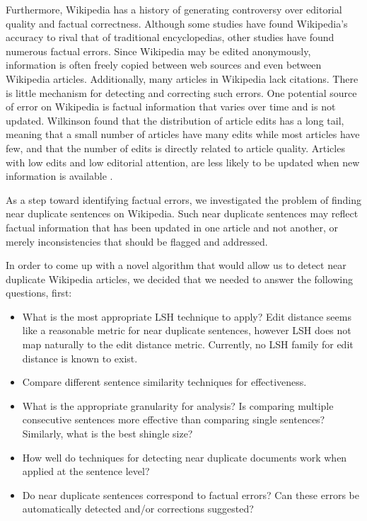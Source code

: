 \documentclass{acm_proc_article-sp}
\begin{document}
Furthermore, Wikipedia has a history of generating controversy over editorial quality and factual correctness. Although some studies have found Wikipedia’s accuracy to rival that of traditional encyclopedias, other studies have found numerous factual errors. Since Wikipedia may be edited anonymously, information is often freely copied between web sources and even between Wikipedia articles. Additionally, many articles in Wikipedia lack citations. There is little mechanism for detecting and correcting such errors. One potential source of error on Wikipedia is factual information that varies over time and is not updated. Wilkinson found that the distribution of article edits has a long tail, meaning that a small number of articles have many edits while most articles have few, and that the number of edits is directly related to article quality. Articles with low edits and low editorial attention, are less likely to be updated when new information is available \cite{wilkinson:wiki}.

As a step toward identifying factual errors, we investigated the problem of finding near duplicate sentences on Wikipedia. Such near duplicate sentences may reflect factual information that has been updated in one article and not another, or merely inconsistencies that should be flagged and addressed. 

In order to come up with a novel algorithm that would allow us to detect near duplicate Wikipedia articles, we decided that we needed to answer the following questions, first:
\begin{itemize}
\item What is the most appropriate LSH technique to apply? Edit distance seems like a reasonable metric for near duplicate sentences, however LSH does not map naturally to the edit distance metric. Currently, no LSH family for edit distance is known to exist.
\item Compare different sentence similarity techniques for effectiveness. 
\item What is the appropriate granularity for analysis? Is comparing multiple consecutive sentences more effective than comparing single sentences? Similarly, what is the best shingle size?
\item How well do techniques for detecting near duplicate documents work when applied at the sentence level?
\item Do near duplicate sentences correspond to factual errors? Can these errors be automatically detected and/or corrections suggested?
\end{itemize}
\end{document}

